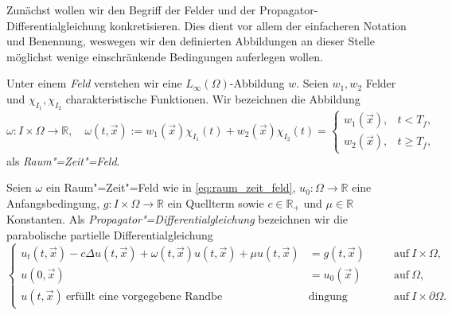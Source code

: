 \documentclass[../main.tex]{subfiles}
\begin{document}
Zunächst wollen wir den Begriff der Felder und der Propagator-Differentialgleichung konkretisieren.
Dies dient vor allem der einfacheren Notation und Benennung, weswegen wir den definierten Abbildungen an dieser Stelle möglichst wenige einschränkende Bedingungen auferlegen wollen.

\begin{Definition}
\label{definition:feld_raum_zeit_feld}
    Unter einem \emph{Feld} verstehen wir eine $L_{\infty}(\Omega)$-Abbildung $w$.
    Seien $w_{1}, w_{2}$ Felder und $\chi_{I_{1}}, \chi_{I_{2}}$ charakteristische Funktionen.
    Wir bezeichnen die Abbildung
    \begin{equation}
    \label{eq:raum_zeit_feld}
        \omega \colon I \times \Omega \to \mathbb{R}, \quad \omega(t, \vec{x}) :=
        w_{1}(\vec{x}) \chi_{I_{1}}(t) + w_{2}(\vec{x}) \chi_{I_{2}}(t)
        =
        \begin{cases}
            w_{1}(\vec{x}), & t < T_{f}, \\
            w_{2}(\vec{x}), & t \geq T_{f},
        \end{cases}
    \end{equation}
    als \emph{Raum"=Zeit"=Feld}.
\end{Definition}

\begin{Definition}
\label{definition:propagator_differentialgleichung}
    Seien $\omega$ ein Raum"=Zeit"=Feld wie in \cref{eq:raum_zeit_feld}, $u_{0} \colon \Omega \to \mathbb{R}$ eine Anfangsbedingung, $g \colon I \times \Omega \to \mathbb{R}$ ein Quellterm sowie $c \in \mathbb{R}_{+}$ und $\mu \in \mathbb{R}$ Konstanten.
    Als \emph{Propagator"=Differentialgleichung} bezeichnen wir die parabolische partielle Differentialgleichung
    \begin{equation}
    \label{eq:propagator_differentialgleichung}
        \left\{
        \begin{aligned}
            u_{t}(t, \vec{x}) - c \Delta u(t, \vec{x}) + \omega(t, \vec{x}) u(t, \vec{x}) + \mu u(t, \vec{x}) &= g(t, \vec{x}) \quad &&\text{auf}~I \times \Omega,\\
            u(0, \vec{x}) &= u_{0}(\vec{x}) \quad &&\text{auf}~\Omega, \\
            u(t, \vec{x})~\text{erfüllt eine vorgegebene Randbe}&\text{dingung} &&\text{auf}~I \times \partial \Omega.
        \end{aligned}
        \right.
    \end{equation}
\end{Definition}
\end{document}
